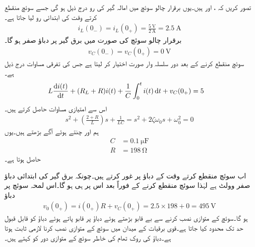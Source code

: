 تصور کریں کہ ،  اور  ہیں۔یوں برقرار چالو سوئچ میں امالہ گیر کی رو درج ذیل ہو گی جسے سوئچ منقطع کرتے وقت کی ابتدائی رو لیا جاتا ہے۔ 
\begin{align*}
i_L(0_-)=i_L(0_+)=\frac{\SI{5}{\volt}}{\SI{2}{\ampere}}=\SI{2.5}{\ampere}
\end{align*} 
برقرار چالو سوئچ کی صورت میں برق گیر پر دباؤ صفر ہو گا۔
\begin{align*}
v_C(0_-)=v_C(0_+)=\SI{0}{\volt}
\end{align*} 
سوئچ منقطع کرنے کے بعد دور سلسلہ وار  صورت اختیار کر لیتا ہے جس کی تفرقی مساوات درج ذیل ہے۔
\begin{align}\label{مساوات_عارضی_تفرقی_دو_درجی_مثال}
L\frac{\dif i(t)}{\dif t}+(R_L+R) i(t)+\frac{1}{C}\int_{0}^{t} i(t) \dif t+v_C(0_+)&=5
\end{align}
اس سے امتیازی مساوات حاصل کرتے ہیں۔
\begin{align*}
s^2+\left(\frac{2+R}{L}\right)s+\frac{1}{LC}=s^2+2\zeta\omega_0 s+\omega_0^2=0
\end{align*}
ہم  اور  چنتے ہوئے آگے بڑھتے ہیں۔یوں
\begin{align*}
C&=\SI{0.1}{\micro\farad}\\
R&=\SI{198}{\ohm}
\end{align*}
حاصل ہوتا ہے۔

اب سوئچ منقطع کرتے وقت کے دباؤ پر غور کرتے ہیں۔چونکہ برق گیر کی ابتدائی دباؤ صفر وولٹ ہے لہٰذا سوئچ منقطع کرنے کے فوراً بعد اس پر  ہی ہو گا۔اس لمحہ سوئچ پر دباؤ
\begin{align*}
v_0(0_+)=i(0_+)R+v_C(0_+)=2.5\times 198+0=\SI{495}{\volt}
\end{align*}
ہو گا۔سوئچ کے متوازی  نصب کرنے سے بے قابو بڑھتے ہوئے دباؤ پر قابو پاتے ہوئے دباؤ کو قابل قبول حد تک محدود کیا جاتا ہے۔قوی برقیات کے میدان میں سوئچ کے متوازی  نصب کرنا لازمی ثابت ہوتا ہے۔دباؤ کی روک تھام کی خاطر سوئچ کے متوازی  دور کو  کہتے ہیں۔


